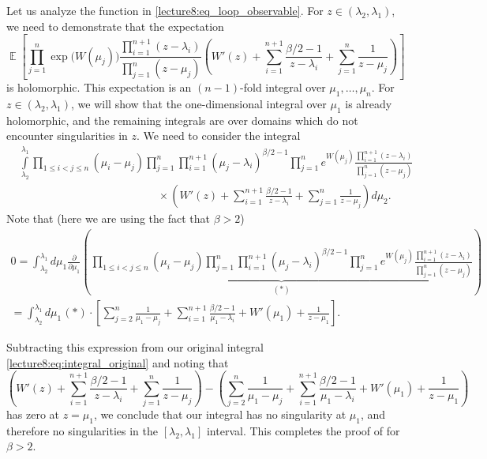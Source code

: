\documentclass[letterpaper,11pt,oneside,reqno]{book}
\numberwithin{equation}{chapter}  %
\newcommand{\ssp}{\hspace{1pt}}
\theoremstyle{definition}
\begin{document}
Let us analyze the function in \eqref{lecture8:eq_loop_observable}. For $z \in (\lambda_2, \lambda_{1})$, we need to demonstrate that the expectation
\begin{equation*}
	\operatorname{\mathbb{E}}\left[\prod_{j=1}^n \exp\bigl(W(\mu_j)\bigr) \frac{\prod_{i=1}^{n+1} (z-\lambda_i)}{\prod_{j=1}^n (z-\mu_j)} \left( W'(z)+\sum_{i=1}^{n+1} \frac{\beta/2-1}{z-\lambda_i} + \sum_{j=1}^n \frac{1}{z-\mu_j}\right)\right]
\end{equation*}
is holomorphic.
This expectation is an $(n-1)$-fold integral over $\mu_1, \ldots, \mu_n$.
For $z\in(\lambda_2,\lambda_1)$, we will show that
the one-dimensional integral over $\mu_1$ is already holomorphic,
and the remaining integrals are over domains which do not encounter singularities in $z$. We
need to consider the integral
\begin{equation}
\label{lecture8:eq:integral_original}
\begin{split}
	&\int\limits_{\lambda_2}^{\lambda_1}
	\prod_{1 \leq i<j \leq n}(\mu_i-\mu_j) \prod_{j=1}^{n}\prod_{i=1}^{n+1}(\mu_j-\lambda_i)^{\beta/2-1} \prod_{j=1}^{n} e^{W(\mu_j)} \frac{\prod_{i=1}^{n+1}(z-\lambda_i)}{\prod_{j=1}^{n}(z-\mu_j)} \\
	&\hspace{150pt}\times
	\left(W'(z) + \sum_{i=1}^{n+1} \frac{\beta/2-1}{z-\lambda_i} + \sum_{j=1}^{n} \frac{1}{z-\mu_j}\right) d\mu_2.
\end{split}
\end{equation}
Note that (here we are using the fact that $\beta>2$)
\begin{multline*}
	0 = \int_{\lambda_2}^{\lambda_1}d\mu_1
	\frac{\partial}{\partial
	\mu_1}\left(\underbrace{\prod_{1 \leq i<j \leq n}(\mu_i-\mu_j)
	\prod_{j=1}^{n}\prod_{i=1}^{n+1}(\mu_j-\lambda_i)^{\beta/2-1} \prod_{j=1}^{n} e^{W(\mu_j)}
	\frac{\prod_{i=1}^{n+1}(z-\lambda_i)}{\prod_{j=1}^{n}(z-\mu_j)}}_{(*)}\right)
	\\
	=
	\int_{\lambda_2}^{\lambda_1}d\mu_1\ssp
	(*)
	\cdot \left[\sum_{j=2}^n \frac{1}{\mu_1-\mu_j} +
	\sum_{i=1}^{n+1} \frac{\beta/2-1}{\mu_1-\lambda_i} +
	W'(\mu_1) + \frac{1}{z-\mu_1}\right].
\end{multline*}

Subtracting this expression from our original integral
\eqref{lecture8:eq:integral_original}
and noting that
\begin{equation*}
\left(W'(z) + \sum_{i=1}^{n+1} \frac{\beta/2-1}{z-\lambda_i} + \sum_{j=1}^{n} \frac{1}{z-\mu_j}\right) - \left(\sum_{j=2}^n \frac{1}{\mu_1-\mu_j} + \sum_{i=1}^{n+1} \frac{\beta/2-1}{\mu_1-\lambda_i} + W'(\mu_1) + \frac{1}{z-\mu_1}\right)
\end{equation*}
has zero at $z = \mu_1$, we conclude that our integral has no singularity at $\mu_1$, and therefore no singularities in the $[\lambda_2, \lambda_1]$ interval.
This completes the proof of  for $\beta>2$.
\end{document}
